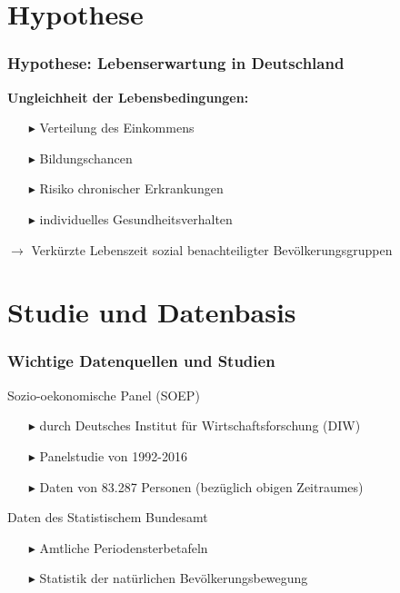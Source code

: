 \documentclass{beamer}
\begin{document}
\section{Hypothese}
\begin{frame}
 \frametitle{Hypothese: Lebenserwartung in Deutschland}
 \textbf{Ungleichheit der Lebensbedingungen:}
 \vspace{0.5cm}
 \begin{itemize}
   \item [$\blacktriangleright$] Verteilung des Einkommens
   \item [$\blacktriangleright$] Bildungschancen
   \item [$\blacktriangleright$] Risiko chronischer Erkrankungen
   \item [$\blacktriangleright$] individuelles Gesundheitsverhalten
 \end{itemize}
 \vspace{0.5cm}
 $\rightarrow$ Verkürzte Lebenszeit sozial benachteiligter Bevölkerungsgruppen
 
\end{frame}


\section{Studie und Datenbasis}
\begin{frame}
\frametitle{Wichtige Datenquellen und Studien}
  \begin{block}{Sozio-oekonomische Panel (SOEP)}
   \begin{itemize}
     \item [$\blacktriangleright$] durch Deutsches Institut für   Wirtschaftsforschung (DIW)
     \item [$\blacktriangleright$] Panelstudie von 1992-2016
     \item [$\blacktriangleright$] Daten von  83.287 Personen (bezüglich obigen Zeitraumes)
   \end{itemize}
  \end{block}
  \begin{block}{Daten des Statistischem Bundesamt}
   \begin{itemize}
     \item [$\blacktriangleright$] Amtliche Periodensterbetafeln
     \item [$\blacktriangleright$] Statistik der natürlichen Bevölkerungsbewegung
   \end{itemize}
  \end{block}
\end{frame}
\end{document}
